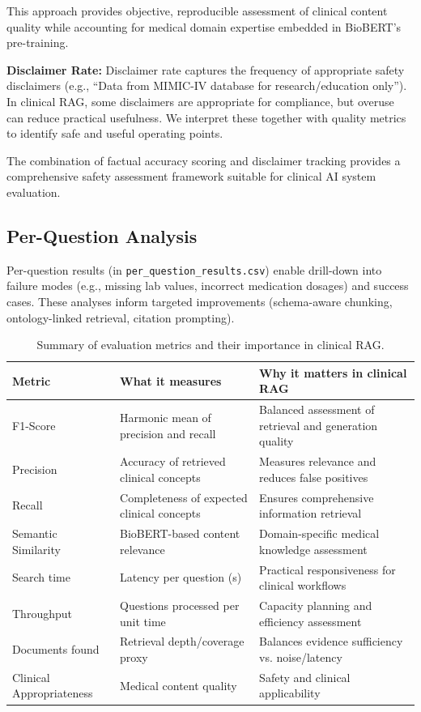 This approach provides objective, reproducible assessment of clinical content quality while accounting for medical domain expertise embedded in BioBERT's pre-training.

\textbf{Disclaimer Rate:}
Disclaimer rate captures the frequency of appropriate safety disclaimers (e.g., ``Data from MIMIC-IV database for research/education only''). In clinical RAG, some disclaimers are appropriate for compliance, but overuse can reduce practical usefulness. We interpret these together with quality metrics to identify safe and useful operating points.

The combination of factual accuracy scoring and disclaimer tracking provides a comprehensive safety assessment framework suitable for clinical AI system evaluation.

\subsection{Per-Question Analysis}
Per-question results (in \texttt{per\_question\_results.csv}) enable drill-down into failure modes (e.g., missing lab values, incorrect medication dosages) and success cases. These analyses inform targeted improvements (schema-aware chunking, ontology-linked retrieval, citation prompting).

\begin{table}[h]
\centering
\begin{footnotesize}
\renewcommand\arraystretch{0.95}
\begin{tabularx}{\textwidth}{l X X}
  \toprule
  Metric & What it measures & Why it matters in clinical RAG \\
  \midrule
  F1-Score & Harmonic mean of precision and recall & Balanced assessment of retrieval and generation quality \\[3em]
  Precision & Accuracy of retrieved clinical concepts & Measures relevance and reduces false positives \\[2em]
  Recall & Completeness of expected clinical concepts & Ensures comprehensive information retrieval \\[2em]
  Semantic Similarity & BioBERT-based content relevance & Domain-specific medical knowledge assessment \\[2em]
  Search time & Latency per question (s) & Practical responsiveness for clinical workflows \\[2em]
  Throughput & Questions processed per unit time & Capacity planning and efficiency assessment \\[2em]
  Documents found & Retrieval depth/coverage proxy & Balances evidence sufficiency vs. noise/latency \\[2em]
  Clinical Appropriateness & Medical content quality & Safety and clinical applicability \\[4pt]
  \bottomrule
\end{tabularx}
\end{footnotesize}
\caption{Summary of evaluation metrics and their importance in clinical RAG.}
\label{tab:metrics_summary}
\end{table}

